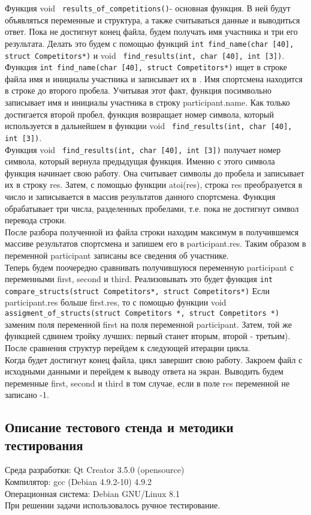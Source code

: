 \documentclass[12pt,a4paper]{report}
\begin{document}
Функция void \verb+ results_of_competitions()+- основная функция. В ней будут объявляться переменные и структура, а также считываться данные и выводиться ответ. Пока не достигнут конец файла, будем получать имя участника и три его результата. Делать это будем с помощью функций \verb+int find_name(char [40], struct Competitors*)+ и void \verb+ find_results(int, char [40], int [3])+.\\
Функция \verb+int find_name(char [40], struct Competitors*)+ ищет в строке файла имя и инициалы участника и записывает их в . Имя спортсмена находится в строке до второго пробела. Учитывая этот факт, функция посимвольно записывает имя и инициалы участника в строку participant.name. Как только достигается второй пробел, функция возвращает номер символа, который используется в дальнейшем в функции void \verb+ find_results(int, char [40], int [3])+.\\
Функция void \verb+ find_results(int, char [40], int [3])+ получает номер символа, который вернула предыдущая функция. Именно с этого символа функция начинает свою работу. Она считывает символы до пробела и записывает их в строку res. Затем, с помощью функции atoi(res), строка res преобразуется в число и записывается в массив результатов данного спортсмена. Функция обрабатывает три числа, разделенных пробелами, т.е. пока не достигнут символ перевода строки. \\
После разбора полученной из файла строки находим максимум в получившемся массиве результатов спортсмена и запишем его в participant.res. Таким образом в переменной participant записаны все сведения об участнике. \\
Теперь будем поочередно сравнивать получившуюся переменную participant с переменными first, second и third. Реализовывать это будет функция \verb+int compare_structs(struct Competitors*, struct Competitors*)+ Если participant.res больше first.res, то с помощью функции void \verb+ assigment_of_structs(struct Competitors *, struct Competitors *)+ заменим поля переменной first на поля переменной participant. Затем, той же функцией сдвинем тройку лучших: первый станет вторым, второй - третьим). \\
После сравнения структур перейдем к следующей итерации цикла. \\
Когда будет достигнут конец файла, цикл завершит свою работу. Закроем файл с исходными данными и перейдем к выводу ответа на экран. Выводить будем переменные first, second и third в том случае, если в поле res переменной не записано -1. 
\subsection{Описание тестового стенда и методики тестирования}
Среда разработки: Qt Creator 3.5.0 (opensource)\\
Компилятор: gcc (Debian 4.9.2-10) 4.9.2 \\
Операционная система: Debian GNU/Linux 8.1 \\
При решении задачи использовалось ручное тестирование. 
\end{document}
